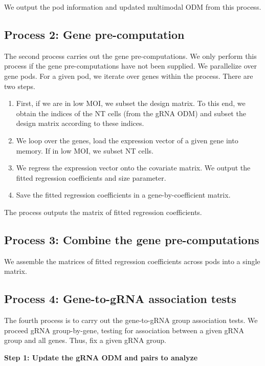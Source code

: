 \documentclass[12pt]{article}
\begin{document}
We output the pod information and updated multimodal ODM from this process.

\subsection*{Process 2: Gene pre-computation}

The second process carries out the gene pre-computations. We only perform this process if the gene pre-computations have not been supplied. We parallelize over gene pods. For a given pod, we iterate over genes within the process. There are two steps.

\begin{enumerate}
\item First, if we are in low MOI, we subset the design matrix. To this end, we obtain the indices of the NT cells (from the gRNA ODM) and subset the design matrix according to these indices.
\item We loop over the genes, load the expression vector of a given gene into memory. If in low MOI, we subset NT cells.
\item We regress the expression vector onto the covariate matrix. We output the fitted regression coefficients and size parameter.
\item Save the fitted regression coefficients in a gene-by-coefficient matrix.
\end{enumerate}

The process outputs the matrix of fitted regression coefficients.

\subsection*{Process 3: Combine the gene pre-computations}

We assemble the matrices of fitted regression coefficients across pods into a single matrix.

\subsection*{Process 4: Gene-to-gRNA association tests}

The fourth process is to carry out the gene-to-gRNA group association tests. We proceed gRNA group-by-gene, testing for association between a given gRNA group and all genes. Thus, fix a given gRNA group.

\begin{center}
	\textbf{Step 1: Update the gRNA ODM and pairs to analyze}
\end{center}
\end{document}
